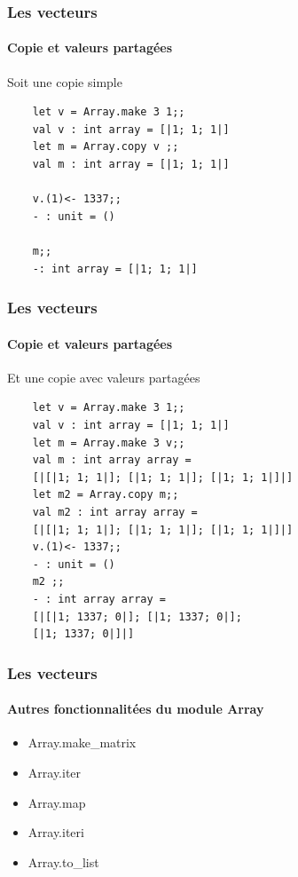\begin{frame}[fragile]
	\frametitle{Les vecteurs}
	\framesubtitle{Copie et valeurs partagées}
	\begin{block}{Soit une copie simple}
	\begin{lstlisting}
	let v = Array.make 3 1;;
	val v : int array = [|1; 1; 1|]
	let m = Array.copy v ;;
	val m : int array = [|1; 1; 1|]

	v.(1)<- 1337;;
	- : unit = ()

	m;;
	-: int array = [|1; 1; 1|]
	\end{lstlisting}
	\end{block}
\end{frame}

\begin{frame}[fragile]
	\frametitle{Les vecteurs}
	\framesubtitle{Copie et valeurs partagées}
	\begin{block}{Et une copie avec valeurs partagées}
	\begin{lstlisting}
	let v = Array.make 3 1;;
	val v : int array = [|1; 1; 1|]
	let m = Array.make 3 v;;
	val m : int array array = 
	[|[|1; 1; 1|]; [|1; 1; 1|]; [|1; 1; 1|]|]
	let m2 = Array.copy m;;
	val m2 : int array array = 
	[|[|1; 1; 1|]; [|1; 1; 1|]; [|1; 1; 1|]|]
	v.(1)<- 1337;;
	- : unit = ()
	m2 ;;
	- : int array array = 
	[|[|1; 1337; 0|]; [|1; 1337; 0|]; 
	[|1; 1337; 0|]|]
	\end{lstlisting}
	\end{block}
\end{frame}


\begin{frame}[fragile]
	\frametitle{Les vecteurs}
	\framesubtitle{Autres fonctionnalitées du module Array}
	\begin{itemize}
	\item Array.make\_matrix
	
	\item Array.iter

	\item Array.map 

	\item Array.iteri

	\item Array.to\_list

	\end{itemize}
\end{frame}

